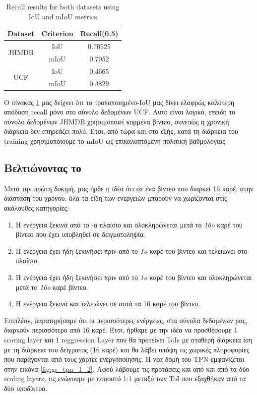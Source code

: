 \en
\begin{table}[h]
  \centering
  \begin{tabular}{|| c | c || c ||}
    \hline
    \textbf{Dataset} & \textbf{Criterion} & \textbf{Recall(0.5)} \\
    \hline  \hline
    \multirow{2}{4em}{JHMDB} & IoU & 0.70525 \\
    \cline{2-3}
    {} & mIoU & 0.7052 \\
    \hline
    \multirow{2}{4em}{UCF} & IoU & 0.4665 \\
    \cline{2-3}
    {} & mIoU & 0.4829 \\
    \hline      
  \end{tabular}
  \caption{\en Recall results for both datasets using IoU and mIoU metrics}
  \label{table:gr_iou_miou}
\end{table}
\gr

Ο πίνακας  \ref{table:gr_iou_miou} μας δείχνει ότι το τροποποιημένο-\en IoU \gr μας δίνει ελαφρώς καλύτερη απόδοση \en recall \gr μόνο στο σύνολο δεδομένων \en UCF\gr.
Αυτό είναι λογικό, επειδή το σύνολο δεδομένων \en JHMDB \gr χρησιμοποιεί κομμένα βίντεο, συνεπώς  η χρονική διάρκεια δεν επηρεάζει πολύ. Έτσι, από τώρα και στο εξής,
κατά τη διάρκεια του \en training \gr χρησιμοποιούμε το \en mIoU  \gr ως επικαλυπτόμενη πολιτική βαθμολογίας.

\subsection{Βελτιώνοντας το  }
\gr Μετά την πρώτη δοκιμή, μας ήρθε η  ιδέα ότι σε ένα βίντεο που διαρκεί 16 καρέ, στην διάσταση του χρόνου, όλα τα είδη των ενεργειών μπορούν να χωρίζονται στις ακόλουθες κατηγορίες:
\begin{enumerate}
\item Η ενέργεια ξεκινά από το -ο πλαίσιο και ολοκληρώνεται μετά το \textit{16o} καρέ του βίντεο που έχει υποβληθεί σε δειγματοληψία.
\item Η ενέργεια έχει ήδη ξεκινήσει πριν από το \textit{1o} καρέ του βίντεο και τελειώνει στο  πλαίσιο.
\item Η ενέργεια έχει ήδη ξεκινήσει πριν από το \textit{1o} καρέ του βίντεο και ολοκληρώνεται μετά το \textit{16o} καρέ βίντεο.
\item Η ενέργεια ξεκινά και τελειώνει σε αυτά τα 16 καρέ του βίντεο.
\end{enumerate}

Επιπλέον, παρατηρήσαμε ότι οι περισσότερες ενέργειες, στα σύνολα δεδομένων μας, διαρκούν περισσότερο από 16 καρέ. Έτσι, ήρθαμε με την ιδέα να προσθέσουμε 1 \en scoring layer \gr και 1
\en reggression Layer \gr που θα προτείνει \en ToIs  \gr με σταθερή διάρκεια ίση με τη διάρκεια του δείγματος (16 καρέ) και θα λάβει υπόψη τις χωρικές πληροφορίες που παράγονται
από τους χάρτες ενεργοποίησης. Η νέα δομή του \en TPN \gr εμφανίζεται στην εικόνα \ref{fig:gr_tpn_1_2}. Αφού λάβουμε τις προτάσεις και από και από τα δύο \en scoling layers\gr,
τις ενώνουμε με ποσοστό 1:1 μεταξύ των \en ToI \gr που εξαχθήκαν από τα δύο υποδίκτυα.


